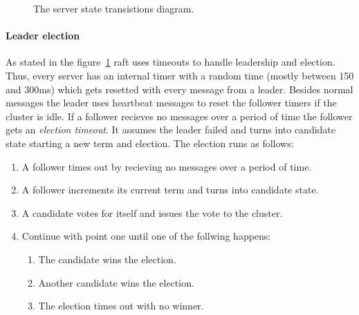 \begin{figure}[ht]
  \centering
  \caption{The server state transistions diagram.~\cite{ongaro2014search}}
  \label{fig:serverstates}
\end{figure}

\paragraph{Leader election}
As stated in the figure~\ref{fig:serverstates} raft uses timeouts to handle
leadership and election. Thus, every server has an internal timer with a
random time (mostly between 150 and 300ms) which gets resetted with
every message from a leader. Besides normal messages the leader uses
heartbeat messages to reset the follower timers if the cluster is idle.
If a follower recieves no messages over a period of time the
follower gets an \textit{election timeout}. It assumes the leader
failed and turns into candidate state starting a new term and
election. The election runs as follows:~\cite{ongaro2014search}

\begin{enumerate}
\item A follower times out by recieving no messages over a period of time.
\item A follower increments its current term and turns into candidate state.
\item A candidate votes for itself and issues the vote to the cluster.
\item Continue with point one until one of the follwing happens:
  \begin{enumerate}
  \item The candidate wins the election.
  \item Another candidate wins the election.
  \item The election times out with no winner.
  \end{enumerate}
\end{enumerate}

